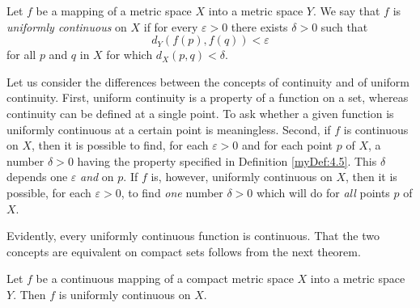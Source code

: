\begin{myDef}
    \label{myDef:4.18}
    Let $f$ be a mapping of a metric space $X$ into a metric space $Y$.
    We say that $f$ is \emph{uniformly continuous} on $X$ 
    if for every $\varepsilon > 0$ there exists $\delta > 0$
    such that
    \begin{equation}
        \label{eq:4.15}
        d_Y(f(p),f(q)) < \varepsilon
    \end{equation}
    for all $p$ and $q$ in $X$ for which $d_X(p, q) < \delta$.
\end{myDef}
Let us consider the differences between the concepts of continuity and of
uniform continuity. 
First, uniform continuity is a property of a function on a set, 
whereas continuity can be defined at a single point. 
To ask whether a given function is uniformly continuous at a certain point is meaningless. 
Second, if $f$ is continuous on $X$, 
then it is possible to find, 
for each $\varepsilon > 0$ and for each point $p$ of $X$, 
a number $\delta > 0$ having the property specified in Definition \ref{myDef:4.5}. 
This $\delta$ depends one $\varepsilon$ \emph{and} on $p$. 
If $f$ is, however, uniformly continuous on $X$, 
then it is possible, for each $\varepsilon > 0$, 
to find \emph{one} number $\delta > 0$ which will do for \emph{all} points $p$ of $X$.

Evidently, every uniformly continuous function is continuous. 
That the two concepts are equivalent on compact sets follows from the next theorem. 

\begin{thm}
    \label{thm:4.19}
    Let $f$ be a continuous mapping of a compact metric space $X$ into a metric space $Y$. 
    Then $f$ is uniformly continuous on $X$.
\end{thm}

